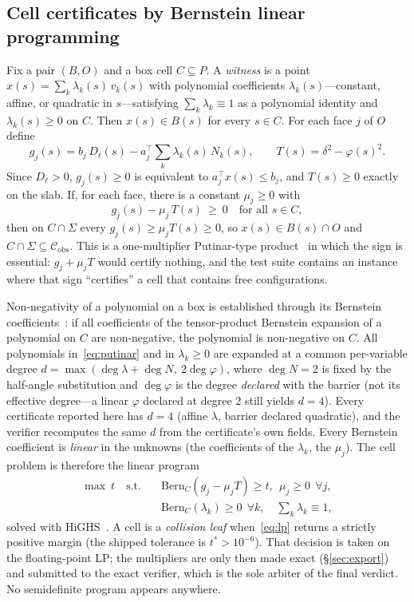 \documentclass[10pt,twocolumn,letterpaper]{article}
\newcommand{\Bern}{\mathrm{Bern}}
\newcommand{\Cobs}{\mathcal{C}_{\mathrm{obs}}}
\newcommand{\vphi}{\varphi}
\begin{document}
\subsection{Cell certificates by Bernstein linear programming}\label{sec:cellcert}
Fix a pair $(B,O)$ and a box cell $C\subseteq P$. A \emph{witness} is a point $x(s)=\sum_k\lambda_k(s)\,v_k(s)$ with polynomial coefficients $\lambda_k(s)$---constant, affine, or quadratic in $s$---satisfying $\sum_k\lambda_k\equiv1$ as a polynomial identity and $\lambda_k(s)\ge0$ on $C$. Then $x(s)\in B(s)$ for every $s\in C$. For each face $j$ of $O$ define
\[
g_j(s)=b_j\,D_\ell(s)-a_j^{\!\top}\!\sum_k\lambda_k(s)\,N_k(s),\qquad T(s)=\delta^2-\vphi(s)^2 .
\]
Since $D_\ell>0$, $g_j(s)\ge0$ is equivalent to $a_j^{\top}x(s)\le b_j$, and $T(s)\ge0$ exactly on the slab. If, for each face, there is a constant $\mu_j\ge0$ with
\begin{equation}\label{eq:putinar}
g_j(s)-\mu_j\,T(s)\ \ge\ 0\quad\text{for all }s\in C,
\end{equation}
then on $C\cap\Sigma$ every $g_j(s)\ge\mu_j T(s)\ge0$, so $x(s)\in B(s)\cap O$ and $C\cap\Sigma\subseteq\Cobs$. This is a one-multiplier Putinar-type product~\cite{putinar1993} in which the sign is essential: $g_j+\mu_jT$ would certify nothing, and the test suite contains an instance where that sign ``certifies'' a cell that contains free configurations.

Non-negativity of a polynomial on a box is established through its Bernstein coefficients~\cite{garloff1985}: if all coefficients of the tensor-product Bernstein expansion of a polynomial on $C$ are non-negative, the polynomial is non-negative on $C$. All polynomials in~\eqref{eq:putinar} and in $\lambda_k\ge0$ are expanded at a common per-variable degree $d=\max(\deg\lambda+\deg N,\ 2\deg\vphi)$, where $\deg N=2$ is fixed by the half-angle substitution and $\deg\vphi$ is the degree \emph{declared} with the barrier (not its effective degree---a linear $\vphi$ declared at degree 2 still yields $d=4$). Every certificate reported here has $d=4$ (affine $\lambda$, barrier declared quadratic), and the verifier recomputes the same $d$ from the certificate's own fields. Every Bernstein coefficient is \emph{linear} in the unknowns (the coefficients of the $\lambda_k$, the $\mu_j$). The cell problem is therefore the linear program
\begin{equation}\label{eq:lp}
\begin{aligned}
\max\ t\quad\text{s.t.}\quad &\Bern_C(g_j-\mu_jT)\ge t,\ \ \mu_j\ge0\ \ \forall j,\\
&\Bern_C(\lambda_k)\ge0\ \ \forall k,\quad \textstyle\sum_k\lambda_k\equiv1,
\end{aligned}
\end{equation}
solved with HiGHS~\cite{huangfu2018}. A cell is a \emph{collision leaf} when~\eqref{eq:lp} returns a strictly positive margin (the shipped tolerance is $t^*>10^{-6}$). That decision is taken on the floating-point LP; the multipliers are only then made exact (\S\ref{sec:export}) and submitted to the exact verifier, which is the sole arbiter of the final verdict. No semidefinite program appears anywhere.
\end{document}
